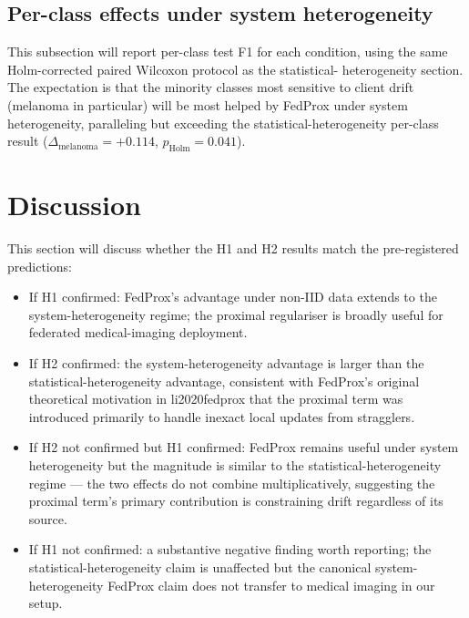 \documentclass[11pt,a4paper]{article}
\providecommand{\citet}[1]{#1}
\newif\ifshowtodosh
\newcommand{\TODOhpcSH}[1]{%
  \ifshowtodosh\textcolor{red}{\textbf{[SH-HPC: #1]}}\else#1\fi}
\begin{document}
\subsection{Per-class effects under system heterogeneity}

\TODOhpcSH{This subsection will report per-class test F1 for each condition,
using the same Holm-corrected paired Wilcoxon protocol as the statistical-
heterogeneity section. The expectation is that the minority classes most
sensitive to client drift (melanoma in particular) will be most helped by
FedProx under system heterogeneity, paralleling but exceeding the
statistical-heterogeneity per-class result ($\Delta_\text{melanoma} = +0.114$,
$p_{\text{Holm}} = 0.041$).}

\section{Discussion}

\TODOhpcSH{This section will discuss whether the H1 and H2 results match
the pre-registered predictions:

\begin{itemize}
\item If H1 confirmed: FedProx's advantage under non-IID data extends to
the system-heterogeneity regime; the proximal regulariser is broadly
useful for federated medical-imaging deployment.
\item If H2 confirmed: the system-heterogeneity advantage is larger than
the statistical-heterogeneity advantage, consistent with FedProx's
original theoretical motivation in \citet{li2020fedprox} that the
proximal term was introduced primarily to handle inexact local updates
from stragglers.
\item If H2 not confirmed but H1 confirmed: FedProx remains useful under
system heterogeneity but the magnitude is similar to the
statistical-heterogeneity regime --- the two effects do not combine
multiplicatively, suggesting the proximal term's primary contribution is
constraining drift regardless of its source.
\item If H1 not confirmed: a substantive negative finding worth
reporting; the statistical-heterogeneity claim is unaffected but the
canonical system-heterogeneity FedProx claim does not transfer to medical
imaging in our setup.
\end{itemize}}
\end{document}
